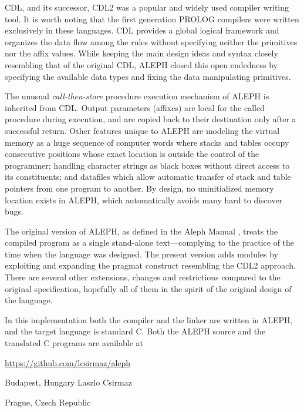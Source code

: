 \documentclass[titlepage]{article}
\newcommand\A{\textsf{ALEPH}}
\newcommand\g[1]{\textsf{\color{blue!90!black}#1}}
\begin{document}
\g{CDL}, and its successor, \g{CDL2} was a popular and widely used compiler
writing tool. It is worth noting that the first generation \g{PROLOG}
compilers were written exclusively in these languages. \g{CDL} provides a
global logical framework and organizes the data flow among the rules without
specifying neither the primitives nor the affix values. While keeping the
main design ideas and syntax closely resembling that of the original
\g{CDL}, \A{} closed this open endedness by specifying the available
data types and fixing the data manipulating primitives.

The unusual \emph{call-then-store} procedure execution mechanism of \A{} is
inherited from \g{CDL}. Output parameters (affixes) are local for the called
procedure during execution, and are copied back to their destination only
after a successful return. Other features unique to \A{} are modeling the
virtual memory as a huge sequence of computer words where stacks and tables
occupy consecutive positions whose exact location is outside the control of
the programmer; handling character strings as black boxes without direct
access to its constituents; and datafiles which allow automatic transfer of
stack and table pointers from one program to another. By design, no
uninitialized memory location exists in \A, which automatically avoids many
hard to discover bugs.

The original version of \A, as defined in the Aleph Manual \cite{A-manual},
treats the compiled program as a single stand-alone text---complying to the
practice of the time when the language was designed. The present version
adds modules by exploiting and expanding the \g{pragmat} construct
resembling the \g{CDL2} approach. There are several other extensions,
changes and restrictions compared to the original specification, hopefully
all of them in the spirit of the original design of the language.

\smallskip

In this implementation both the compiler and the linker are written in \A,
and the target language is standard {\sf C}. Both the \A{} source and the
translated {\sf C} programs are available at
\begin{center}
\url{https://github.com/lcsirmaz/aleph}
\end{center}

\vskip 20pt

\noindent
Budapest, Hungary \hfill Laszlo Csirmaz

\noindent
Prague, Czech Republic
\end{document}
